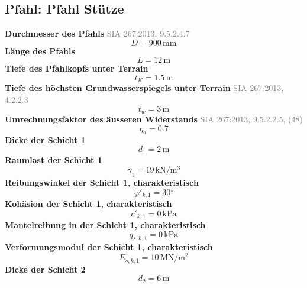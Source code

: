 \documentclass[11pt,a4paper]{article}
\newcommand{\normref}[1]{{\small\textcolor{gray}{#1}}}
\begin{document}
\subsection{Pfahl: Pfahl Stütze}
\noindent\textbf{Durchmesser des Pfahls} \hfill \normref{SIA 267:2013, 9.5.2.4.7}
\begin{equation*}
D = 900\,\mathrm{mm}
\end{equation*}
\noindent\textbf{Länge des Pfahls}
\begin{equation*}
L = 12\,\mathrm{m}
\end{equation*}
\noindent\textbf{Tiefe des Pfahlkopfs unter Terrain}
\begin{equation*}
t_K = 1.5\,\mathrm{m}
\end{equation*}
\noindent\textbf{Tiefe des höchsten Grundwasserspiegels unter Terrain} \hfill \normref{SIA 267:2013, 4.2.2.3}
\begin{equation*}
t_w = 3\,\mathrm{m}
\end{equation*}
\noindent\textbf{Umrechnungsfaktor des äusseren Widerstands} \hfill \normref{SIA 267:2013, 9.5.2.2.5, (48)}
\begin{equation*}
\eta_a = 0.7
\end{equation*}
\noindent\textbf{Dicke der Schicht 1}
\begin{equation*}
d_{1} = 2\,\mathrm{m}
\end{equation*}
\noindent\textbf{Raumlast der Schicht 1}
\begin{equation*}
\gamma_{1} = 19\,\mathrm{kN}/\mathrm{m}^{3}
\end{equation*}
\noindent\textbf{Reibungswinkel der Schicht 1, charakteristisch}
\begin{equation*}
\varphi'_{k,1} = 30{}^{\circ}
\end{equation*}
\noindent\textbf{Kohäsion der Schicht 1, charakteristisch}
\begin{equation*}
c'_{k,1} = 0\,\mathrm{kPa}
\end{equation*}
\noindent\textbf{Mantelreibung in der Schicht 1, charakteristisch}
\begin{equation*}
q_{s,k,1} = 0\,\mathrm{kPa}
\end{equation*}
\noindent\textbf{Verformungsmodul der Schicht 1, charakteristisch}
\begin{equation*}
E_{s,k,1} = 10\,\mathrm{MN}/\mathrm{m}^{2}
\end{equation*}
\noindent\textbf{Dicke der Schicht 2}
\begin{equation*}
d_{2} = 6\,\mathrm{m}
\end{equation*}
\end{document}
